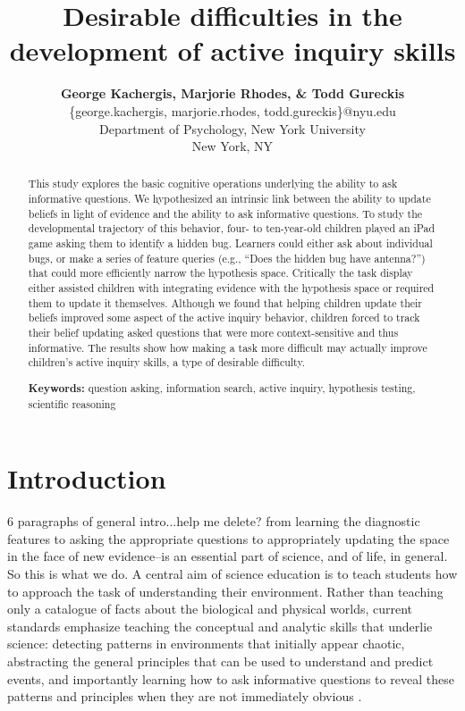 \documentclass[10pt,letterpaper]{article}
\title{Desirable difficulties in the development of active inquiry skills}
\author{
  {\large \bf George Kachergis, Marjorie Rhodes, \& Todd Gureckis} \\
  \{george.kachergis, marjorie.rhodes, todd.gureckis\}@nyu.edu \\
  Department of Psychology, New York University \\
  New York, NY
}
\begin{document}
\maketitle

\begin{abstract}
This study explores the basic cognitive operations underlying the ability to ask 
informative questions.  We hypothesized an intrinsic link between the ability to 
update beliefs in light of evidence and the ability to ask informative questions. To 
study the developmental trajectory of this behavior, four- to ten-year-old children 
played an iPad game asking them to identify a hidden bug. Learners could either 
ask about individual bugs, or make a series of feature queries (e.g., ``Does the 
hidden bug have antenna?'') that could more efficiently narrow the hypothesis 
space. Critically the task display either assisted children with integrating evidence 
with the hypothesis space or required them to update it themselves.  Although we 
found that helping children update their beliefs improved some aspect of the active 
inquiry behavior, children forced to track their belief updating asked questions that 
were more context-sensitive and thus informative.  The results show how making a 
task more difficult may actually improve children's active inquiry skills, a type of 
desirable difficulty.

\textbf{Keywords:} 
question asking, information search, active inquiry, hypothesis testing, scientific 
reasoning
\end{abstract}


\section{Introduction} 


6 paragraphs of general intro...help me delete? 
from learning the diagnostic features to asking the appropriate questions to 
appropriately updating the space in the face of new evidence--is an essential part of 
science, and of life, in general. So this is what we do.
A central aim of science education is to teach students how to approach the task of 
understanding their environment. Rather than teaching only a catalogue of facts 
about the biological and physical worlds, current standards emphasize teaching the 
conceptual and analytic skills that underlie science: detecting patterns in 
environments that initially appear chaotic, abstracting the general principles that can 
be used to understand and predict events, and importantly learning how to ask 
informative questions to reveal these patterns and principles when they are not 
immediately obvious \cite{Bransford:2000,Donovan:2005,Duschl:2007}. 
\end{document}
